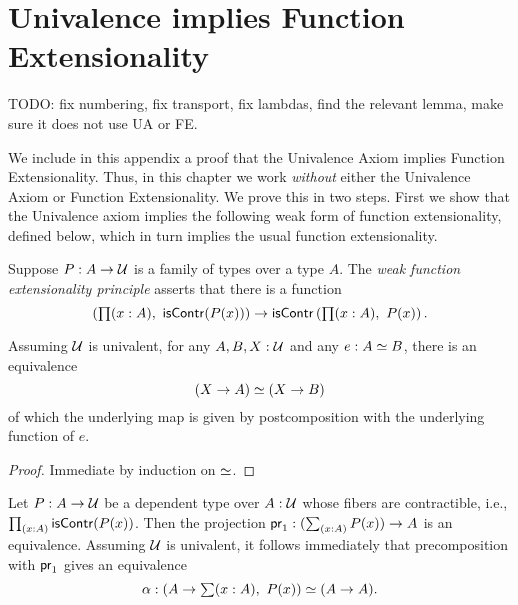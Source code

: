 \chapter{Univalence implies Function Extensionality}


TODO: fix numbering, fix transport, fix lambdas, find the relevant lemma, make sure it does not use UA or FE.

We include in this appendix a proof that the Univalence Axiom implies Function
Extensionality. Thus, in this chapter we work \emph{without} either the Univalence Axiom
or Function Extensionality. We prove this in two steps. First we show that the Univalence
axiom implies the following weak form of function extensionality, defined below, which in turn implies the usual function extensionality.

\begin{defn}
Suppose $P : A \to \mathcal{U}$ is a family of types over a type $A$. The \emph{weak function extensionality principle} asserts that there is a function
\begin{equation*}
\left(\prd{x:A}\iscontr(P(x))\right)
  \to\iscontr \left(\prd{x:A}P(x)\right).
\end{equation*}
\end{defn}

\begin{lem} \label{UA-eqv-hom-eqv}
Assuming $\mathcal{U}$ is univalent, for any $A,B,X:\mathcal{U}$ and any $e:A \simeq B$, there is an equivalence
\begin{equation*}
(X\to A) \simeq (X\to B)
\end{equation*}
of which the underlying map is given by postcomposition with the underlying function of $e$.
\end{lem}

\begin{proof}
Immediate by induction on $ \simeq $. 
\end{proof}

\begin{cor}
Let $P:A\to\mathcal{U}$ be a dependent type over $A:\mathcal{U}$ whose fibers are contractible, i.e., $\prd{x:A}\iscontr(P(x))$.
Then the projection $\proj{1}:(\sm{x:A}P(x))\to A$ is an equivalence. Assuming $\mathcal{U}$ is univalent, it follows immediately that precomposition with $\mathsf{pr}_{1}$ gives an equivalence
\begin{equation*}
\alpha : \eqv{(A\to\sm{x:A}P(x))}{(A\to A)}.
\end{equation*}
\end{cor}

